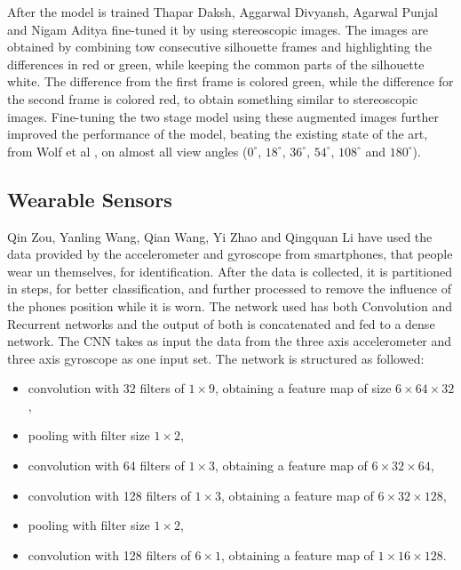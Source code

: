 \documentclass[12pt]{article}
\theoremstyle{definition}
\begin{document}
	After the model is trained Thapar Daksh, Aggarwal Divyansh, Agarwal Punjal and Nigam Aditya \cite{VGR-Net} fine-tuned it by using stereoscopic images. The images are obtained by combining tow consecutive silhouette frames and highlighting the differences in red or green, while keeping the common parts of the silhouette white. The difference from the first frame is colored green, while the difference for the second frame is colored red, to obtain something similar to stereoscopic images. Fine-tuning the two stage model using these augmented images further improved the performance of the model, beating the existing state of the art, from Wolf et al \cite{Wolf2016MultiviewGR}, on almost all view angles ($0^\circ$, $18^\circ$, $36^\circ$, $54^\circ$, $108^\circ$ and $180^\circ$).

	\subsection{Wearable Sensors}

	Qin Zou, Yanling Wang, Qian Wang, Yi Zhao and Qingquan Li \cite{smartphone-gait} have used the data provided by the accelerometer and gyroscope from smartphones, that people wear un themselves, for identification. After the data is collected, it is partitioned in steps, for better classification, and further processed to remove the influence of the phones position while it is worn. The network used has both Convolution and Recurrent networks and the output of both is concatenated and fed to a dense network. The CNN takes as input the data from the three axis accelerometer and three axis gyroscope as one input set. The network is structured as followed:
	\begin{itemize}
		\item convolution with 32 filters of $1 \times 9$, obtaining a feature map of size $6 \times 64 \times 32$,
		\item pooling with filter size $1 \times 2$,
		\item convolution with 64 filters of $1 \times 3$, obtaining a feature map of $6 \times 32 \times 64$,
		\item convolution with 128 filters of $1 \times 3$, obtaining a feature map of $6 \times 32 \times 128$,
		\item pooling with filter size $1 \times 2$,
		\item convolution with 128 filters of $6 \times 1$, obtaining a feature map of $1 \times 16 \times 128$.
	\end{itemize}
\end{document}
